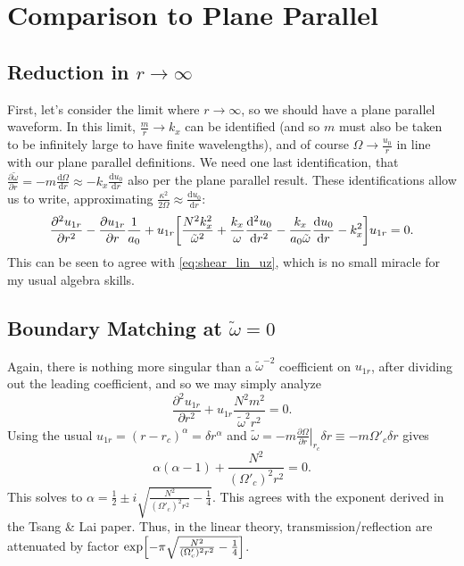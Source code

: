\documentclass[11pt,
        usenames, %
        dvipsnames %
    ]{report}
\newcommand*{\rd}[2]{\frac{\mathrm{d}#1}{\mathrm{d}#2}}
\newcommand*{\pd}[2]{\frac{\partial#1}{\partial#2}}
\newcommand*{\rtd}[2]{\frac{\mathrm{d}^2#1}{\mathrm{d}#2^2}}
\newcommand*{\ptd}[2]{\frac{\partial^2 #1}{\partial#2^2}}
\newcommand*{\at}[1]{\left.#1\right|}
\DeclarePairedDelimiter\s{\lbrack}{\rbrack}
\begin{document}
\section{Comparison to Plane Parallel}

\subsection{Reduction in $r \to \infty$}

First, let's consider the limit where $r \to \infty$, so we should have a plane
parallel waveform. In this limit, $\frac{m}{r} \to k_x$ can be identified (and
so $m$ must also be taken to be infinitely large to have finite wavelengths),
and of course $\Omega \to \frac{u_0}{r}$ in line with our plane parallel
definitions. We need one last identification, that $\pd{\tilde{\omega}}{r} =
-m\rd{\Omega}{r} \approx -k_x\rd{u_0}{r}$ also per the plane parallel result.
These identifications allow us to write, approximating $\frac{\kappa^2}{2\Omega}
\approx \rd{u_0}{r}$:
\begin{equation}
    \ptd{u_{1r}}{r} - \pd{u_{1r}}{r}\frac{1}{a_0} +
        u_{1r}\s*{\frac{N^2k_x^2}{\tilde{\omega}^2}
            + \frac{k_x}{\omega} \rtd{u_0}{r} - \frac{k_x}{a_0\tilde{\omega}}
            \rd{u_0}{r} - k_x^2}u_{1r} = 0.
\end{equation}
This can be seen to agree with \autoref{eq:shear_lin_uz}, which is no small
miracle for my usual algebra skills.

\subsection{Boundary Matching at $\tilde{\omega} = 0$}

Again, there is nothing more singular than a $\tilde{\omega}^{-2}$ coefficient
on $u_{1r}$, after dividing out the leading coefficient, and so we may simply
analyze
\begin{equation}
    \ptd{u_{1r}}{r} + u_{1r}\frac{N^2m^2}{\tilde{\omega}^2r^2} = 0.
\end{equation}
Using the usual $u_{1r} = (r - r_c)^\alpha = \delta r^\alpha$ and
$\tilde{\omega} = -m\at{\pd{\Omega}{r}}_{r_c}\delta r \equiv -m\Omega'_c \delta
r$ gives
\begin{equation}
    \alpha(\alpha - 1) + \frac{N^2}{(\Omega'_c)^2r^2} = 0.\label{eq:cylin_crit}
\end{equation}
This solves to $\alpha = \frac{1}{2} \pm
i\sqrt{\frac{N^2}{(\Omega'_c)^2r^2} - \frac{1}{4}}$. This agrees with
the exponent derived in the Tsang \& Lai paper. Thus, in the linear theory,
transmission/reflection are attenuated by factor
$\exp\s*{-\pi\sqrt{\frac{N^2}{(\Omega'_c)^2 r^2} - \frac{1}{4}}}$.
\end{document}
